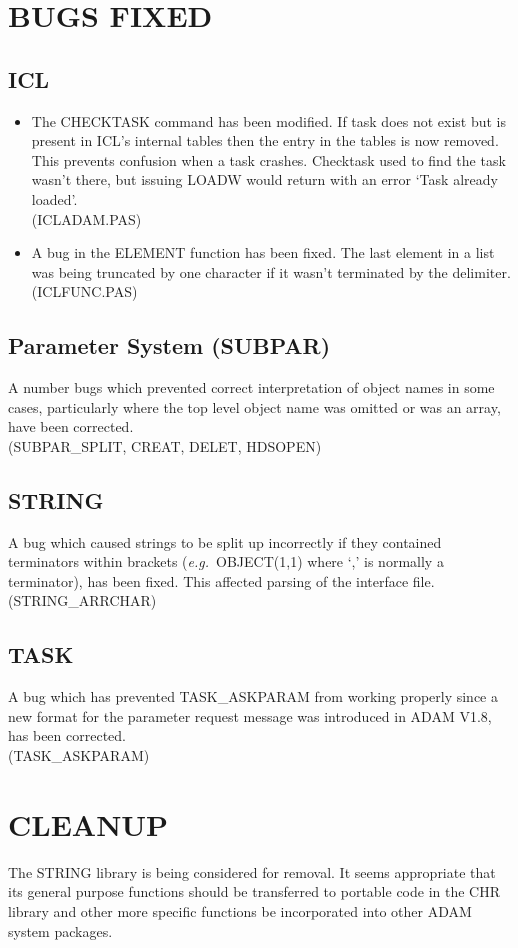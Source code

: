 \section{BUGS FIXED}

\subsection{ICL}
\begin{itemize}
\item The CHECKTASK command has been modified.
If task does not exist but is present in ICL's internal tables
then the entry in the tables is now removed. 
This prevents confusion when a task crashes. 
Checktask used to find the task wasn't there, but issuing LOADW
would return with an error `Task already loaded'.\\
(ICLADAM.PAS)
\item A bug in the ELEMENT function has been fixed.
The last element in a list was being truncated
by one character if it wasn't terminated by the delimiter.\\
(ICLFUNC.PAS)
\end{itemize}

\subsection{Parameter System (SUBPAR)}

A number bugs which prevented correct interpretation of object names in some
cases, particularly where the top level object name was omitted or was an 
array, have been corrected.\\
(SUBPAR\_\-SPLIT, CREAT, DELET, HDS\-OPEN)

\subsection{STRING}
A bug which caused strings to be split up incorrectly if they contained
terminators within brackets ({\em e.g.}\ OBJECT(1,1) where `,' is normally
a terminator), has been fixed.
This affected parsing of the interface file.\\
(STRING\_\-ARRCHAR)

\subsection{TASK}
\label{task}
A bug which has prevented TASK\_ASKPARAM from working properly since a new
format for the parameter request message was introduced in ADAM V1.8, has
been corrected.\\
(TASK\_ASKPARAM)


\section{CLEANUP}
The STRING library is being considered for removal. It seems appropriate that
its general purpose functions should be transferred to portable code in the
CHR library and other more specific functions be incorporated into other
ADAM system packages.

